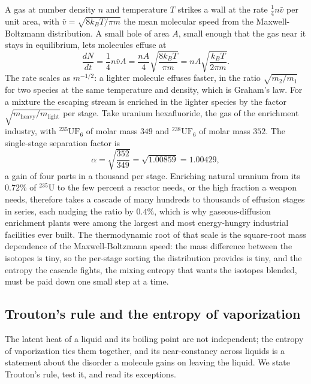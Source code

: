 A gas at number density $n$ and temperature $T$ strikes a wall at the rate
$\tfrac14 n \bar v$ per unit area, with $\bar v = \sqrt{8 k_B T/\pi m}$ the mean
molecular speed from the Maxwell-Boltzmann distribution. A small hole of area
$A$, small enough that the gas near it stays in equilibrium, lets molecules
effuse at
\[
\frac{dN}{dt} = \frac14 n \bar v A = \frac{n A}{4}\sqrt{\frac{8 k_B T}{\pi m}}
= n A \sqrt{\frac{k_B T}{2\pi m}}.
\]
The rate scales as $m^{-1/2}$: a lighter molecule effuses faster, in the ratio
$\sqrt{m_2/m_1}$ for two species at the same temperature and density, which is
Graham's law. For a mixture the escaping stream is enriched in the lighter
species by the factor $\sqrt{m_{\text{heavy}}/m_{\text{light}}}$ per stage. Take
uranium hexafluoride, the gas of the enrichment industry, with $^{235}\text{UF}_6$
of molar mass $349$ and $^{238}\text{UF}_6$ of molar mass $352$. The
single-stage separation factor is
\[
\alpha = \sqrt{\frac{352}{349}} = \sqrt{1.00859} = 1.00429,
\]
a gain of four parts in a thousand per stage. Enriching natural uranium from its
$0.72\%$ of $^{235}\text{U}$ to the few percent a reactor needs, or the high
fraction a weapon needs, therefore takes a cascade of many hundreds to thousands
of effusion stages in series, each nudging the ratio by $0.4\%$, which is why
gaseous-diffusion enrichment plants were among the largest and most
energy-hungry industrial facilities ever built. The thermodynamic root of that
scale is the square-root mass dependence of the Maxwell-Boltzmann speed: the
mass difference between the isotopes is tiny, so the per-stage sorting the
distribution provides is tiny, and the entropy the cascade fights, the mixing
entropy that wants the isotopes blended, must be paid down one small step at a
time.

\subsection{Trouton's rule and the entropy of vaporization}

The latent heat of a liquid and its boiling point are not independent; the
entropy of vaporization ties them together, and its near-constancy across
liquids is a statement about the disorder a molecule gains on leaving the
liquid. We state Trouton's rule, test it, and read its exceptions.

